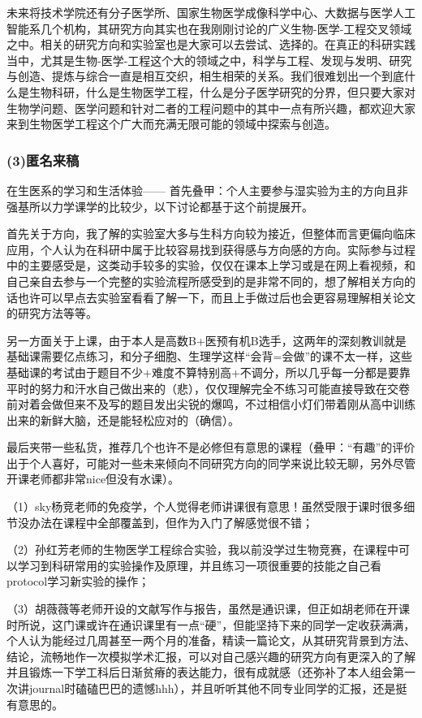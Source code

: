 \documentclass[11pt,oneside]{book}
\begin{document}
未来将技术学院还有分子医学所、国家生物医学成像科学中心、大数据与医学人工智能系几个机构，其研究方向其实也在我刚刚讨论的广义生物-医学-工程交叉领域之中。相关的研究方向和实验室也是大家可以去尝试、选择的。在真正的科研实践当中，尤其是生物-医学-工程这个大的领域之中，科学与工程、发现与发明、研究与创造、提炼与综合一直是相互交织，相生相荣的关系。我们很难划出一个到底什么是生物科研，什么是生物医学工程，什么是分子医学研究的分界，但只要大家对生物学问题、医学问题和针对二者的工程问题中的其中一点有所兴趣，都欢迎大家来到生物医学工程这个广大而充满无限可能的领域中探索与创造。

\subsubsection{(3)匿名来稿}
在生医系的学习和生活体验——
首先叠甲：个人主要参与湿实验为主的方向且非强基所以力学课学的比较少，以下讨论都基于这个前提展开。

首先关于方向，我了解的实验室大多与生科方向较为接近，但整体而言更偏向临床应用，个人认为在科研中属于比较容易找到获得感与方向感的方向。实际参与过程中的主要感受是，这类动手较多的实验，仅仅在课本上学习或是在网上看视频，和自己亲自去参与一个完整的实验流程所感受到的是非常不同的，想了解相关方向的话也许可以早点去实验室看看了解一下，而且上手做过后也会更容易理解相关论文的研究方法等等。

另一方面关于上课，由于本人是高数B+医预有机B选手，这两年的深刻教训就是基础课需要亿点练习，和分子细胞、生理学这样“会背=会做”的课不太一样，这些基础课的考试由于题目不少+难度不算特别高+不调分，所以几乎每一分都是要靠平时的努力和汗水自己做出来的（悲），仅仅理解完全不练习可能直接导致在交卷前对着会做但来不及写的题目发出尖锐的爆鸣，不过相信小灯们带着刚从高中训练出来的新鲜大脑，还是能轻松应对的（确信）。

最后夹带一些私货，推荐几个也许不是必修但有意思的课程（叠甲：“有趣”的评价出于个人喜好，可能对一些未来倾向不同研究方向的同学来说比较无聊，另外尽管开课老师都非常nice但没有水课）。

（1）sky杨竞老师的免疫学，个人觉得老师讲课很有意思！虽然受限于课时很多细节没办法在课程中全部覆盖到，但作为入门了解感觉很不错；

（2）孙红芳老师的生物医学工程综合实验，我以前没学过生物竞赛，在课程中可以学习到科研常用的实验操作及原理，并且练习一项很重要的技能之自己看protocol学习新实验的操作；

（3）胡薇薇等老师开设的文献写作与报告，虽然是通识课，但正如胡老师在开课时所说，这门课或许在通识课里有一点“硬”，但能坚持下来的同学一定收获满满，个人认为能经过几周甚至一两个月的准备，精读一篇论文，从其研究背景到方法、结论，流畅地作一次模拟学术汇报，可以对自己感兴趣的研究方向有更深入的了解并且锻炼一下学工科后日渐贫瘠的表达能力，很有成就感（还弥补了本人组会第一次讲journal时磕磕巴巴的遗憾hhh），并且听听其他不同专业同学的汇报，还是挺有意思的。
\end{document}
